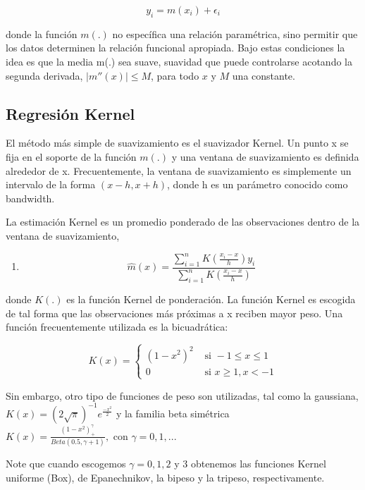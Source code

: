\documentclass[
  12pt,
]{krantz}
\providecommand{\tightlist}{%
  \setlength{\itemsep}{0pt}\setlength{\parskip}{0pt}}
\begin{document}
\[\displaystyle{y_{i} = m(x_{i}) + \epsilon_{i}}\]

donde la función \(m(.)\) no específica una relación paramétrica, sino
permitir que los datos determinen la relación funcional apropiada. Bajo
estas condiciones la idea es que la media m(.) sea suave, suavidad que
puede controlarse acotando la segunda derivada, \(|m''(x)| \leq M\), para todo
\(x\) y \(M\) una constante.

\hypertarget{regresion-kernel}{%
\subsection{Regresión Kernel}\label{regresion-kernel}}

El método más simple de suavizamiento es el suavizador Kernel. Un
punto x se fija en el soporte de la función \(m(.)\) y una ventana de
suavizamiento es definida alrededor de x. Frecuentemente, la ventana de
suavizamiento es simplemente un intervalo de la forma \((x - h, x + h)\),
donde h es un parámetro conocido como bandwidth.

La estimación Kernel es un promedio ponderado de las observaciones
dentro de la ventana de suavizamiento,

\begin{enumerate}
\def\labelenumi{(\arabic{enumi})}
\setcounter{enumi}{2}
\tightlist
\item
  \[
  \hat{m}(x) = \frac{\sum_{i=1}^{n} K(\frac{x_{i}-x}{h}) y_{i}}{\sum_{i=1}^{n} K(\frac{x_{i}-x}{h})}
  \]
\end{enumerate}

donde \(K(.)\) es la función Kernel de ponderación. La función Kernel es escogida
de tal forma que las observaciones más próximas a x reciben mayor peso. Una
función frecuentemente utilizada es la bicuadrática:

\[
K(x) = \left\{
\begin{array}{ll}
(1-x^2)^2 &  \text{ si }  -1 \leq x  \leq 1 \\
0   & \text{ si }  x \ge 1,  x<-1
\end{array}
\right.
\]

Sin embargo, otro tipo de funciones de peso son utilizadas, tal como la
gaussiana, \(K(x) = (2 \sqrt{\pi})^{-1} e^{\frac{-x^2}{2}}\) y la familia beta simétrica \(K(x) = \frac{(1-x^2)_{+}^{\gamma}}{Beta(0.5,\gamma+1)}, \text{ con } \gamma = 0,1,...\)

Note que cuando escogemos \(\gamma = 0, 1, 2\) y \(3\) obtenemos las funciones Kernel uniforme (Box), de Epanechnikov, la bipeso y la tripeso, respectivamente.
\end{document}
